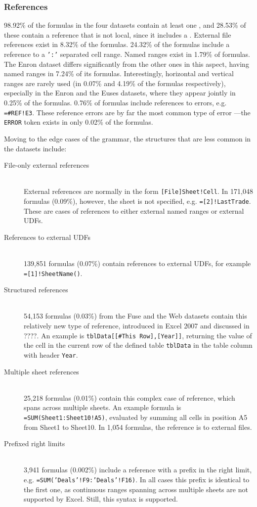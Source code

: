 \documentclass[times]{smrauth}
\begin{document}
\subsubsection{References}

98.92\% of the formulas in the four datasets contain at least one , and 28.53\% of these contain a reference that is not local, since it includes a . External file references exist in 8.32\% of the formulas. 24.32\% of the formulas include a reference to a \texttt{':'} separated cell range. Named ranges exist in 1.79\% of formulas. The Enron dataset differs significantly from the other ones in this aspect, having named ranges in 7.24\% of its formulas. Interestingly, horizontal and vertical ranges are rarely used (in 0.07\% and 4.19\% of the formulas respectively), especially in the Enron and the Euses datasets, where they appear jointly in 0.25\% of the formulas. 0.76\% of formulas include references to errors, e.g. \texttt{=\#REF!E3}. These reference errors are by far the most common type of error ---the \texttt{ERROR} token exists in only 0.02\% of the formulas.

Moving to the edge cases of the grammar, the structures that are less common in the datasets include:
\begin{description}
	\item[File-only external references] \hfill \\
	External references are normally in the form \texttt{[File]Sheet!Cell}. In 171,048 formulas (0.09\%), however, the sheet is not specified, e.g. \texttt{=[2]!LastTrade}. These are cases of references to either external named ranges or external UDFs.
	\item[References to external UDFs] \hfill \\
	139,851 formulas (0.07\%) contain references to external UDFs, for example \texttt{=[1]!SheetName()}.
	\item[Structured references] \hfill \\
	54,153 formulas (0.03\%) from the Fuse and the Web datasets contain this relatively new type of reference, introduced in Excel 2007 and discussed in ????. An example is \texttt{tblData[[\#This Row],[Year]]}, returning the value of the cell in the current row of the defined table \texttt{tblData} in the table column with header \texttt{Year}.
	\item[Multiple sheet references] \hfill \\
	25,218 formulas (0.01\%) contain this complex case of reference, which spans across multiple sheets. An example formula is \texttt{=SUM(Sheet1:Sheet10!A5)}, evaluated by summing all cells in position A5 from Sheet1 to Sheet10. In 1,054 formulas, the reference is to external files.
	\item[Prefixed right limits] \hfill \\
	3,941 formulas (0.002\%) include a reference with a prefix in the right limit, e.g. \texttt{=SUM('Deals'!F9:'Deals'!F16)}. In all cases this prefix is identical to the first one, as continuous ranges spanning across multiple sheets are not supported by Excel. Still, this syntax is supported.
\end{description}
\end{document}
